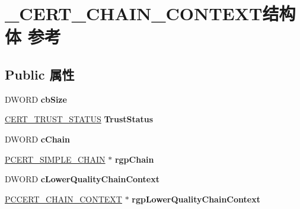 \hypertarget{struct___c_e_r_t___c_h_a_i_n___c_o_n_t_e_x_t}{}\section{\+\_\+\+C\+E\+R\+T\+\_\+\+C\+H\+A\+I\+N\+\_\+\+C\+O\+N\+T\+E\+X\+T结构体 参考}
\label{struct___c_e_r_t___c_h_a_i_n___c_o_n_t_e_x_t}
\subsection*{Public 属性}
\begin{DoxyCompactItemize}
\item 
\mbox{\label{struct___c_e_r_t___c_h_a_i_n___c_o_n_t_e_x_t_af650ff7ae6ce03a99d2ffe121eeb18c1}} 
D\+W\+O\+RD {\bfseries cb\+Size}
\item 
\mbox{\label{struct___c_e_r_t___c_h_a_i_n___c_o_n_t_e_x_t_ab251cb0413869954ef6d24c256335ac7}} 
\hyperlink{struct___c_e_r_t___t_r_u_s_t___s_t_a_t_u_s}{C\+E\+R\+T\+\_\+\+T\+R\+U\+S\+T\+\_\+\+S\+T\+A\+T\+US} {\bfseries Trust\+Status}
\item 
\mbox{\label{struct___c_e_r_t___c_h_a_i_n___c_o_n_t_e_x_t_ad7ab7b7c3e19e611ca89fef9bde9ad67}} 
D\+W\+O\+RD {\bfseries c\+Chain}
\item 
\mbox{\label{struct___c_e_r_t___c_h_a_i_n___c_o_n_t_e_x_t_a3bf767bbf07330ed241c191283d5957b}} 
\hyperlink{struct___c_e_r_t___s_i_m_p_l_e___c_h_a_i_n}{P\+C\+E\+R\+T\+\_\+\+S\+I\+M\+P\+L\+E\+\_\+\+C\+H\+A\+IN} $\ast$ {\bfseries rgp\+Chain}
\item 
\mbox{\label{struct___c_e_r_t___c_h_a_i_n___c_o_n_t_e_x_t_a528f8adf41e89906985b7fde6d9d847f}} 
D\+W\+O\+RD {\bfseries c\+Lower\+Quality\+Chain\+Context}
\item 
\mbox{\label{struct___c_e_r_t___c_h_a_i_n___c_o_n_t_e_x_t_ad2062f15ba40eb348de9e601c9d3b425}} 
\hyperlink{struct___c_e_r_t___c_h_a_i_n___c_o_n_t_e_x_t}{P\+C\+C\+E\+R\+T\+\_\+\+C\+H\+A\+I\+N\+\_\+\+C\+O\+N\+T\+E\+XT} $\ast$ {\bfseries rgp\+Lower\+Quality\+Chain\+Context}

\end{DoxyCompactItemize}
